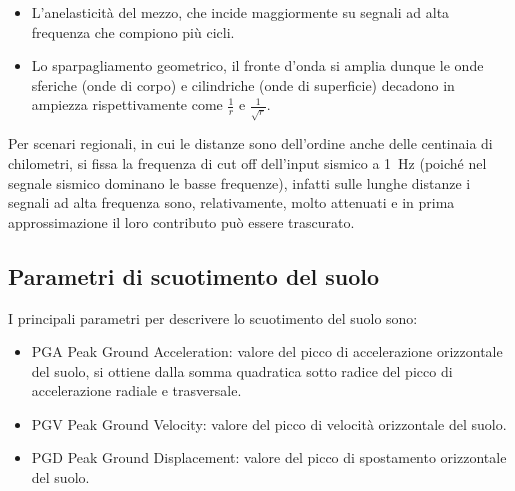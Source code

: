 \documentclass[a4paper,12pt,titlepage]{article}
\begin{document}
\begin{itemize}
\item  L'anelasticità del mezzo, che incide maggiormente su segnali ad alta frequenza che compiono più cicli.
\item Lo sparpagliamento geometrico, il fronte d'onda si amplia dunque le onde sferiche (onde di corpo) e cilindriche (onde di superficie) decadono in ampiezza rispettivamente come $\frac{1}{r}$ e $\frac{1}{\sqrt{r}}$.
\end{itemize}
%
Per scenari regionali, in cui le distanze sono dell'ordine anche delle centinaia di chilometri, si fissa la frequenza di cut off dell'input sismico a \SI{1}{\hertz} (poiché nel segnale sismico dominano le basse frequenze), infatti sulle lunghe distanze i segnali ad alta frequenza sono, relativamente, molto attenuati e in prima approssimazione il loro contributo può essere trascurato.
\clearpage

\subsection{Parametri di scuotimento del suolo}

I principali parametri per descrivere lo scuotimento del suolo sono:
\begin{itemize}
\item PGA Peak Ground Acceleration: valore del picco di accelerazione orizzontale del suolo, si ottiene dalla somma quadratica sotto radice del picco di accelerazione radiale e trasversale.
\item PGV Peak Ground Velocity: valore del picco di velocità orizzontale del suolo.
\item PGD Peak Ground Displacement: valore del picco di spostamento orizzontale del suolo.
\end{itemize}
\end{document}
